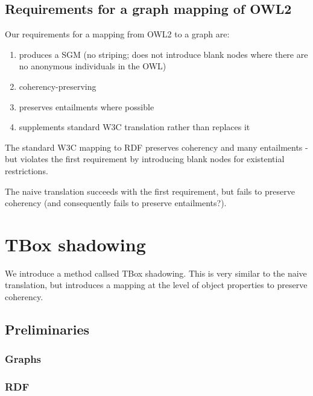 \documentclass{my}
\begin{document}
\subsection{Requirements for a graph mapping of OWL2}

Our requirements for a mapping from OWL2 to a graph are:

\begin{enumerate}

\item produces a SGM (no striping; does not introduce blank nodes where there are
  no anonymous individuals in the OWL)

\item coherency-preserving

\item preserves entailments where possible

\item supplements standard W3C translation rather than replaces it

\end{enumerate}

The standard W3C mapping to RDF preserves coherency and many
entailments - but violates the first requirement by introducing blank
nodes for existential restrictions.

The naive translation succeeds with the first requirement, but fails
to preserve coherency (and consequently fails to preserve
entailments?). 

\section{TBox shadowing}

We introduce a method callsed TBox shadowing. This is very similar to
the naive translation, but introduces a mapping at the level of object
properties to preserve coherency.

\subsection{Preliminaries}

\subsubsection{Graphs}

\subsubsection{RDF}
\end{document}
